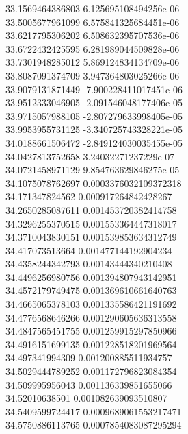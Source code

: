 {33.1569464386803 6.125695108494256e-06 \\
33.5005677961099 6.575841325684451e-06 \\
33.6217795306202 6.508632395707536e-06 \\
33.6722432425595 6.281989044509828e-06 \\
33.7301948285012 5.869124834134709e-06 \\
33.8087091374709 3.947364803025266e-06 \\
33.9079131871449 -7.900228411017451e-06 \\
33.9512333046905 -2.091546048177406e-05 \\
33.9715057988105 -2.807279633998405e-05 \\
33.9953955731125 -3.340725743328221e-05 \\
34.0188661506472 -2.849124030035455e-05 \\
34.0427813752658 3.24032271237229e-07 \\
34.0721458971129 9.854763629846275e-05 \\
34.1075078762697 0.0003376032109372318 \\
34.171347824562 0.000917264842428267 \\
34.2650285087611 0.001453720382414758 \\
34.3296255370515 0.001553364447318017 \\
34.3710043830151 0.001539853634312749 \\
34.417073513664 0.001477144192904234 \\
34.4358244342793 0.00143444340210408 \\
34.4496256980756 0.001394807943142951 \\
34.4572179749475 0.001369610661640763 \\
34.4665065378103 0.001335586421191692 \\
34.4776568646266 0.001290605636313558 \\
34.4847565451755 0.001259915297850966 \\
34.4916151699135 0.001228518201969564 \\
34.497341994309 0.001200885511934757 \\
34.5029444789252 0.001172796823084354 \\
34.509995956043 0.001136339851655066 \\
34.52010638501 0.001082639093510807 \\
34.5409599724417 0.0009689061553217471 \\
34.5750886113765 0.0007854083087295294 \\
}
